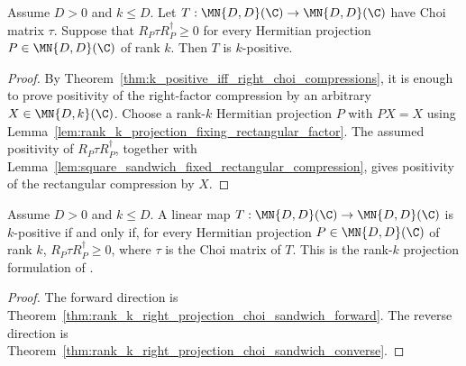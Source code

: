 \begin{theorem}
    \label{thm:rank_k_right_projection_choi_sandwich_converse}
    \leanok
    Assume $D>0$ and $k\le D$. Let
    $T:\MN{D,D}(\C)\to\MN{D,D}(\C)$ have Choi matrix $\tau$. Suppose that
    $R_P\tau R_P^\dagger\geq0$ for every Hermitian projection
    $P\in\MN{D,D}(\C)$ of rank $k$. Then $T$ is $k$-positive.
\end{theorem}

\begin{proof}
    \leanok
    By Theorem~\ref{thm:k_positive_iff_right_choi_compressions}, it is enough
    to prove positivity of the right-factor compression by an arbitrary
    $X\in\MN{D,k}(\C)$. Choose a rank-$k$ Hermitian projection $P$ with
    $PX=X$ using
    Lemma~\ref{lem:rank_k_projection_fixing_rectangular_factor}. The assumed
    positivity of $R_P\tau R_P^\dagger$, together with
    Lemma~\ref{lem:square_sandwich_fixed_rectangular_compression}, gives
    positivity of the rectangular compression by $X$.
\end{proof}

\begin{theorem}
    \label{thm:rank_k_right_projection_choi_criterion}
    \leanok
    Assume $D>0$ and $k\le D$. A linear map
    $T:\MN{D,D}(\C)\to\MN{D,D}(\C)$ is $k$-positive if and only if, for every
    Hermitian projection $P\in\MN{D,D}(\C)$ of rank $k$,
    $R_P\tau R_P^\dagger\geq0$, where $\tau$ is the Choi matrix of $T$.
    This is the rank-$k$ projection formulation of
    \cite[Chapter~3, Proposition~3.1]{Wolf2012Quantum}.
\end{theorem}

\begin{proof}
    \leanok
    The forward direction is
    Theorem~\ref{thm:rank_k_right_projection_choi_sandwich_forward}. The
    reverse direction is
    Theorem~\ref{thm:rank_k_right_projection_choi_sandwich_converse}.
\end{proof}


